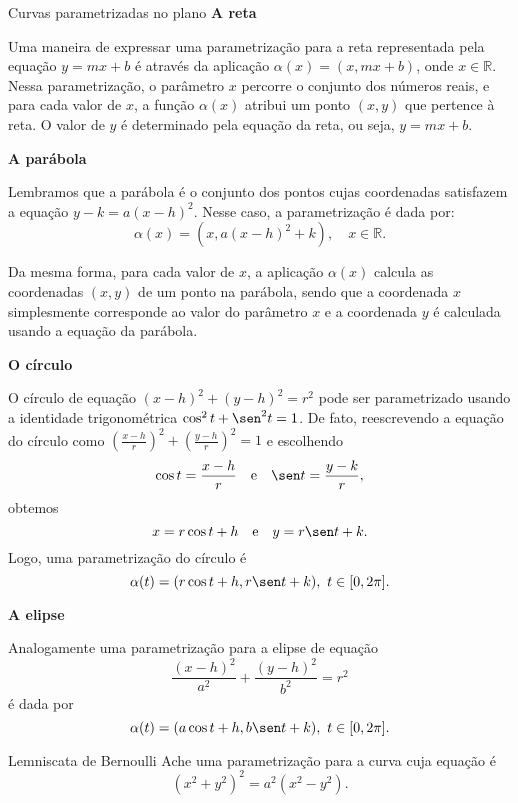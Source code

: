 \begin{examples}{Curvas parametrizadas no plano}{}
        \textbf{A reta}
        
        Uma maneira de expressar uma parametrização para a reta representada pela equação $y = mx + b$ é através da aplicação $\alpha(x) = (x, mx + b)$, onde $x \in \mathbb{R}$. Nessa parametrização, o parâmetro $x$ percorre o conjunto dos números reais, e para cada valor de $x$, a função $\alpha(x)$ atribui um ponto $(x, y)$ que pertence à reta. O valor de $y$ é determinado pela equação da reta, ou seja, $y = mx + b$. 

        \textbf{A parábola}

Lembramos que a parábola é o conjunto dos pontos cujas coordenadas satisfazem a equação $y - k = a(x - h)^2$.  Nesse caso, a parametrização é dada por:
\[ \alpha(x) = (x, a(x - h)^2 + k), \quad x \in \mathbb{R}.  \]

Da mesma forma, para cada valor de $x$, a aplicação $\alpha(x)$ calcula as coordenadas $(x, y)$ de um ponto na parábola, sendo que a coordenada $x$ simplesmente corresponde ao valor do parâmetro $x$ e a coordenada $y$ é calculada usando a equação da parábola. 

\textbf{O círculo}
        
        O círculo de equação $(x-h)^2+(y-h)^2=r^2$ pode ser parametrizado usando a identidade trigonométrica $\cos^2t+\sen^2t=1$. De fato, reescrevendo a equação do círculo como $\left(\frac{x-h}{r}\right)^2+\left(\frac{y-h}{r}\right)^2=1$ e escolhendo
        $$\cos t = \frac{x-h}{r} \quad \mbox{e} \quad \sen t = \frac{y-k}{r},$$
        obtemos
        $$x=r\cos t + h \quad \mbox{e} \quad y=r\sen t+k.$$
        Logo, uma parametrização do círculo é  $$\alpha(t)=(r\cos t + h,r\sen t+k),~t\in[0,2\pi]. $$


        \textbf{A elipse}

        Analogamente uma parametrização para a elipse de equação $$\frac{(x-h)^2}{a^2}+\frac{(y-h)^2}{b^2}=r^2$$ é dada por 
        $$\alpha(t)=(a\cos t + h,b\sen t+k),~t\in[0,2\pi]. $$


\end{examples}


\begin{exercise}{Lemniscata de Bernoulli}{}
Ache uma parametrização para a curva cuja equação é $$(x^2+y^2)^2=a^2(x^2-y^2).$$
\end{exercise}


